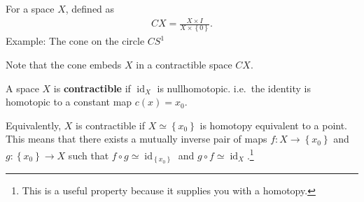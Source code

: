 \begin{definition}[Cone]

For a space \(X\), defined as
\begin{align*}  
CX = \frac{X\times I} {X \times\left\{{0}\right\}}
.\end{align*}
Example: The cone on the circle \(CS^1\)

Note that the cone embeds \(X\) in a contractible space \(CX\).

\end{definition}

\begin{definition}[Contractible]

A space \(X\) is \textbf{contractible} if \(\operatorname{id}_X\) is
nullhomotopic. i.e.~the identity is homotopic to a constant map
\(c(x) = x_0\).

Equivalently, \(X\) is contractible if \(X \simeq\left\{{x_0}\right\}\)
is homotopy equivalent to a point. This means that there exists a
mutually inverse pair of maps \(f: X \to\left\{{x_0}\right\}\) and
\(g:\left\{{x_0}\right\} \to X\) such that
\(f\circ g \simeq\operatorname{id}_{\left\{{x_0}\right\}}\) and
\(g\circ f \simeq\operatorname{id}_X\).\footnote{This is a useful
  property because it supplies you with a homotopy.}

\end{definition}

\begin{definition}[Coproduct]

\end{definition}



